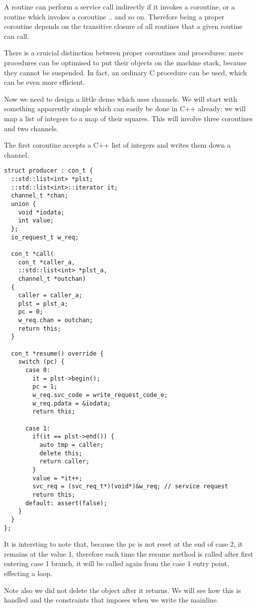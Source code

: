 \documentclass[oneside]{book}
\begin{document}
A routine can perform a service call indirectly if it invokes a coroutine, or a routine
which invokes a coroutine .. and so on. Therefore being a proper coroutine depends on
the transitive closure of all routines that a given routine can call.

There is a cruicial distinction between proper coroutines and procedures: mere procedures
can be optimised to put their objects on the machine stack, because they cannot be suspended.
In fact, an ordinary C procedure can be used, which can be even more efficient.

Now we need to design a little demo which uses channels. We will start with something
apparently simple which can easily be done in C++ already: we will map a list of integers
to a map of their squares. This will involve three coroutines and two channels.

The first coroutine accepts a C++ list of integers and writes them down a channel.

\begin{verbatim}
struct producer : con_t {
  ::std::list<int> *plst;
  ::std::list<int>::iterator it;
  channel_t *chan;
  union {
    void *iodata;
    int value;
  };
  io_request_t w_req;

  con_t *call(
    con_t *caller_a, 
    ::std::list<int> *plst_a,
    channel_t *outchan)
  { 
    caller = caller_a;
    plst = plst_a;
    pc = 0;
    w_req.chan = outchan;
    return this;
  }

  con_t *resume() override {
    switch (pc) {
      case 0:
        it = plst->begin();
        pc = 1;
        w_req.svc_code = write_request_code_e;
        w_req.pdata = &iodata;
        return this;

      case 1:
        if(it == plst->end()) { 
          auto tmp = caller; 
          delete this;
          return caller; 
        }
        value = *it++;
        svc_req = (svc_req_t*)(void*)&w_req; // service request
        return this;
      default: assert(false);
    }
  }
};
\end{verbatim}

It is intersting to note that, because the pc is not reset at the end
of case 2, it remains at the value 1, therefore each time the resume
method is called after first entering case 1 branch, it will be called
again from the case 1 entry point, effecting a loop.

Note also we did not delete the object after it returns. We will see how this
is handled and the constraints that imposes when we write the mainline.
\end{document}

